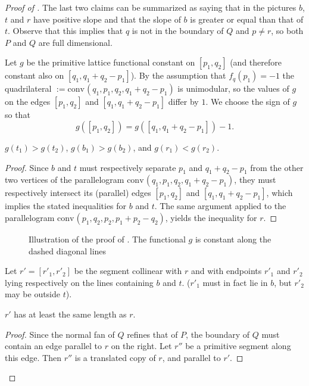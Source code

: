 \documentclass[12pt]{article}
\newcommand{\conv}{\ensuremath{\mathrm{conv}}\hspace{1pt}}
\begin{document}
\begin{proof}[Proof of ]
The last two claims can be summarized as saying that in the pictures $b$, $t$ and $r$ have positive slope and that the slope of $b$ is greater or equal than that of $t$. Observe that this implies that $q$ is not in the boundary of $Q$ and $p \neq r$, so both $P$ and $Q$ are full dimensional.


Let $g$ be the primitive lattice functional constant on $[p_1, q_2]$ (and therefore constant also on $[q_1, q_1+q_2-p_1]$). By the assumption that $f_q(p_1)=-1$ the quadrilateral $:=\conv(q_1, p_1, q_2, q_1+q_2-p_1)$
 is unimodular, so  the values of $g$ on the edges $[p_1, q_2]$ and $[q_1, q_1+q_2-p_1]$ differ by $1$. We choose the sign of $g$ so that 
\[
g([p_1, q_2])= g( [q_1, q_1+q_2-p_1]) -1. 
\]

\begin{claim}
\label{claim:g}
$g(t_1) > g(t_2)$, $g(b_1) > g(b_2)$, and $g(r_1) < g(r_2)$.
\end{claim}

\begin{proof}
Since $b$ and $t$ must respectively separate $p_1$ and $q_1+q_2-p_1$ from the other two vertices of the parallelogram $\conv(q_1, p_1, q_2, q_1+q_2-p_1)$, they must respectively intersect its (parallel) edges $[p_1, q_2]$ and $[q_1, q_1+q_2-p_1]$, which implies the stated inequalities for $b$ and $t$.
The same argument  applied to the parallelogram  $\conv(p_1, q_2, p_2, p_1+p_2-q_2)$, yields the inequality for $r$.
\end{proof}

\begin{figure}[htb]
\scalebox{.75}{}
\caption{Illustration of the proof of . The functional $g$ is constant along the dashed diagonal lines}
\label{fig:claim4}
\end{figure}


Let $r'=[r'_1,r'_2]$ be the segment collinear with $r$ and with endpoints $r'_1$ and $r'_2$ lying respectively on the lines containing $b$ and $t$. ($r'_1$ must in fact lie in $b$, but $r'_2$ may be outside $t$).

\begin{claim}
\label{claim:r2}
$r'$ has at least the same length as $r$. 
\end{claim}

\begin{proof}
Since the normal fan of $Q$ refines that of $P$, the boundary of $Q$ must contain an edge parallel to $r$ on the right. Let $r''$ be a primitive segment along this edge. Then $r''$ is a translated copy of $r$, and parallel to $r'$. 


\end{proof}
\end{proof}
\end{document}
